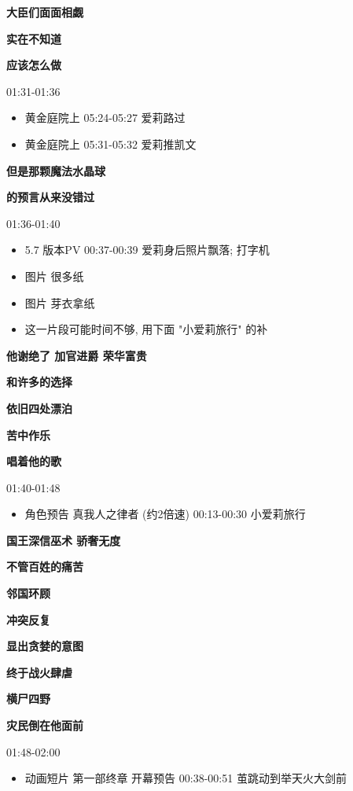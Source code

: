 \documentclass[a4paper]{article}
\begin{document}
\textbf{大臣们面面相觑}

\textbf{实在不知道}

\textbf{应该怎么做}

01:31-01:36

\begin{itemize}
    \item 黄金庭院上 05:24-05:27 爱莉路过
    \item 黄金庭院上 05:31-05:32 爱莉推凯文
\end{itemize}

\textbf{但是那颗魔法水晶球}

\textbf{的预言从来没错过}

01:36-01:40

\begin{itemize}
    \item 5.7 版本PV 00:37-00:39 爱莉身后照片飘落; 打字机
    \item 图片 很多纸
    \item 图片 芽衣拿纸
    \item 这一片段可能时间不够, 用下面 "小爱莉旅行" 的补
\end{itemize}

\textbf{他谢绝了 加官进爵 荣华富贵}

\textbf{和许多的选择}

\textbf{依旧四处漂泊}

\textbf{苦中作乐}

\textbf{唱着他的歌}

01:40-01:48

\begin{itemize}
    \item 角色预告 真我人之律者 (约2倍速) 00:13-00:30 小爱莉旅行
\end{itemize}

\textbf{国王深信巫术 骄奢无度}

\textbf{不管百姓的痛苦}

\textbf{邻国环顾}

\textbf{冲突反复}

\textbf{显出贪婪的意图}

\textbf{终于战火肆虐}

\textbf{横尸四野}

\textbf{灾民倒在他面前}

01:48-02:00

\begin{itemize}
    \item 动画短片 第一部终章 开幕预告 00:38-00:51 茧跳动到举天火大剑前
\end{itemize}
\end{document}
